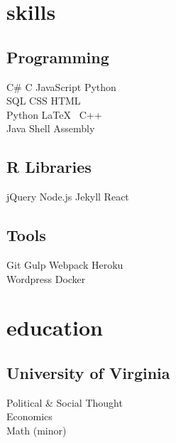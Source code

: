\documentclass{stationery-resume}
\begin{document}
\hfill {\color{primary}\vline} \hfill
\begin{minipage}[t]{0.25\textwidth} 


\section{skills}
\subsection{Programming}
\sectionsep
{}
C\# \textbullet{} C \textbullet{} JavaScript \textbullet{} Python    \\ SQL \textbullet{} CSS \textbullet{} HTML \textbullet{} \\
\sectionsep
{}
Python \textbullet{} \LaTeX\ \textbullet{}  C++  \\
\sectionsep
{}
Java \textbullet{}  Shell \textbullet{} Assembly \\
\sectionsep
\sectionsep
\subsection{R Libraries}
\sectionsep
jQuery \textbullet{} Node.js \textbullet{} Jekyll \textbullet{} React \\
\sectionsep
\sectionsep
\subsection{Tools}
\sectionsep
Git \textbullet{} Gulp \textbullet{} Webpack \textbullet{} Heroku    \\ Wordpress \textbullet{} Docker \\

\sectionsep


\section{education} 
\subsection{University of Virginia}
Political \& Social Thought \\
Economics \\
Math (minor) \\


\end{minipage}
\end{document}
